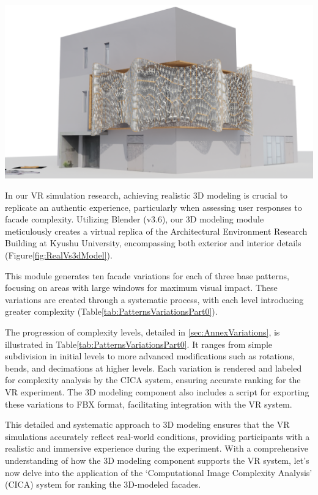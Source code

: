 \begin{table}[htb]
\begin{tabularx}
              {\includegraphics[width=1\linewidth]{Images/Pattern 3/0009}} \\
            \bottomrule
        \end{tabularx}
    \end{table}



In our VR simulation research, achieving realistic 3D modeling is crucial to replicate an authentic experience, particularly when assessing user responses to facade complexity.
Utilizing Blender (v3.6), our 3D modeling module meticulously creates a virtual replica of the Architectural Environment Research Building at Kyushu University, encompassing both exterior and interior details (Figure\ref{fig:RealVs3dModel}).



This module generates ten facade variations for each of three base patterns, focusing on areas with large windows for maximum visual impact.
These variations are created through a systematic process, with each level introducing greater complexity (Table\ref{tab:PatternsVariationsPart0}).



The progression of complexity levels, detailed in \ref{sec:AnnexVariations}, is illustrated in Table\ref{tab:PatternsVariationsPart0}.
It ranges from simple subdivision in initial levels to more advanced modifications such as rotations, bends, and decimations at higher levels.
Each variation is rendered and labeled for complexity analysis by the CICA system, ensuring accurate ranking for the VR experiment.
The 3D modeling component also includes a script for exporting these variations to FBX format, facilitating integration with the VR system.

This detailed and systematic approach to 3D modeling ensures that the VR simulations accurately reflect real-world conditions, providing participants with a realistic and immersive experience during the experiment.
With a comprehensive understanding of how the 3D modeling component supports the VR system, let's now delve into the application of the `Computational Image Complexity Analysis' (CICA) system for ranking the 3D-modeled facades.



